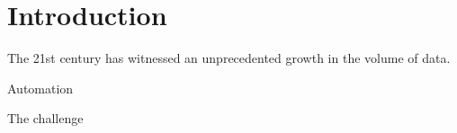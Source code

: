 \chapter{Introduction}

The 21st century has witnessed an unprecedented growth in the volume of data.

Automation

The challenge
